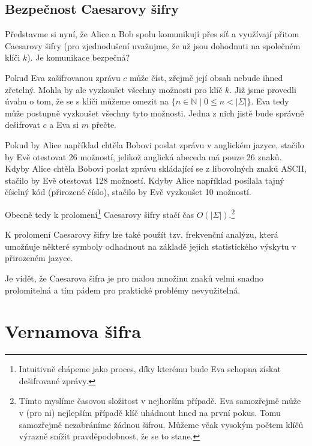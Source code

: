 \documentclass[
  program=infoi,
  biblatex,
  figures=false,
  glossaries,
  index
]{kidiplom}
\begin{document}
    \subsection{Bezpečnost Caesarovy šifry}

        Představme si nyní, že Alice a Bob spolu komunikují přes síť a využívají přitom Caesarovy šifry
        (pro zjednodušení uvažujme, že už jsou dohodnuti na společném klíči $k$).
        Je komunikace bezpečná?

        Pokud Eva zašifrovanou zprávu $c$ může číst, zřejmě její obsah nebude ihned zřetelný. Mohla by ale
        vyzkoušet všechny možnosti pro klíč $k$. Již jsme provedli úvahu o tom, že se s klíči můžeme omezit na
        $\{n \in \mathbb{N} \mid 0 \leq n < |\Sigma|\}$. Eva tedy může postupně vyzkoušet všechny tyto
        možnosti. Jedna z nich jistě bude správně dešifrovat $c$ a Eva si $m$ přečte.

        \medskip

        Pokud by Alice například chtěla Bobovi poslat zprávu v anglickém jazyce,
        stačilo by Evě otestovat 26 možností, jelikož anglická abeceda má pouze 26 znaků.
        Kdyby Alice chtěla Bobovi poslat zprávu skládající se z libovolných znaků ASCII, stačilo by
        Evě otestovat 128 možností.
        Kdyby Alice například posílala tajný číselný kód (přirozené číslo), stačilo by Evě vyzkoušet 10 možností.

        Obecně tedy k prolomení\footnote{Intuitivně chápeme jako proces, díky kterému bude Eva schopna získat dešifrované zprávy.}
        Caesarovy šifry stačí čas $O(|\Sigma|)$.\footnote{Tímto myslíme časovou složitost v nejhorším případě.
        Eva samozřejmě může v (pro ni) nejlepším případě klíč uhádnout hned na první pokus. Tomu samozřejmě nezabráníme žádnou šifrou.
        Můžeme včak vysokým počtem klíčů výrazně snížit pravděpodobnost, že se to stane.}

        K prolomení Caesarovy šifry lze také použít tzv. frekvenční analýzu, která umožňuje některé
        symboly odhadnout na základě jejich statistického výskytu v přirozeném jazyce.

        Je vidět, že Caesarova šifra je pro malou množinu znaků velmi snadno prolomitelná a tím pádem pro praktické problémy nevyužitelná.


\section{Vernamova šifra}
\end{document}
